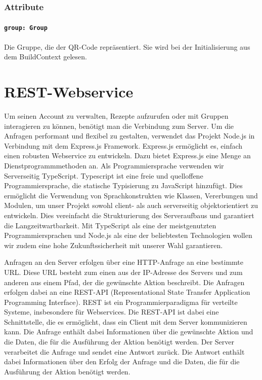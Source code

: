 \documentclass{entwurfsheft}
\begin{document}
\subsubsection*{Attribute}
\paragraph{\texttt{group: Group}}
Die Gruppe, die der QR-Code repräsentiert. Sie wird bei der Initialisierung aus dem \Gls{BuildContext} gelesen.

\newpage
\section{REST-Webservice}
Um seinen Account zu verwalten, Rezepte aufzurufen oder mit Gruppen interagieren zu können, benötigt man die Verbindung zum Server.
Um die Anfragen performant und flexibel zu gestalten, verwendet das Projekt Node.js in Verbindung mit dem Express.js Framework.
Express.js ermöglicht es, einfach einen robusten Webservice zu entwickeln. Dazu bietet Express.js eine Menge an Dienstprogrammmethoden an.
Als Programmiersprache verwenden wir Serverseitig TypeScript. Typescript ist eine freie und quelloffene Programmiersprache, die statische Typisierung zu JavaScript hinzufügt.
Dies ermöglicht die Verwendung von Sprachkonstrukten wie Klassen, Vererbungen und Modulen, um unser Projekt sowohl client- als auch serverseitig objektorientiert zu entwickeln.
Dies vereinfacht die Strukturierung des Serveraufbaus und garantiert die Langzeitwartbarkeit. Mit TypeScript als eine der meistgenutzten Programmiersprachen und Node.js als eine der beliebtesten Technologien wollen wir zudem eine hohe Zukunftssicherheit mit unserer Wahl garantieren.

Anfragen an den Server erfolgen über eine HTTP-Anfrage an eine bestimmte URL. Diese URL besteht zum einen aus der IP-Adresse des Servers und zum anderen aus einem Pfad, der die gewünschte Aktion beschreibt.
Die Anfragen erfolgen dabei an eine REST-API (Representational State Transfer Application Programming Interface). REST ist ein Programmierparadigma für verteilte Systeme, insbesondere für Webservices.
Die REST-API ist dabei eine Schnittstelle, die es ermöglicht, dass ein Client mit dem Server kommunizieren kann.
Die Anfrage enthält dabei Informationen über die gewünschte Aktion und die Daten, die für die Ausführung der Aktion benötigt werden.
Der Server verarbeitet die Anfrage und sendet eine Antwort zurück.
Die Antwort enthält dabei Informationen über den Erfolg der Anfrage und die Daten, die für die Ausführung der Aktion benötigt werden.
\end{document}
